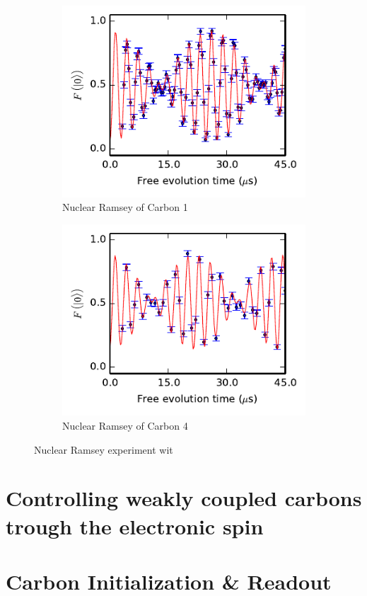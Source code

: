\begin{figure}[t]
    \begin{subfigure}[t]{0.49\textwidth}\centering
    \includegraphics{Img/CarbonRamsey_C1.pdf}
    \caption{Nuclear Ramsey of Carbon 1} \label{fig:CR_C1}
    \end{subfigure}
    \begin{subfigure}[t]{0.49\textwidth}\centering
        \includegraphics{Img/CarbonRamsey_C4.pdf}
        \caption{Nuclear Ramsey of Carbon 4}
        \label{fig:CR_C4}
    \end{subfigure}
    \caption{Nuclear Ramsey experiment wit}
\end{figure}



\section{Controlling weakly coupled carbons trough the electronic spin}





\section{Carbon Initialization \& Readout}




